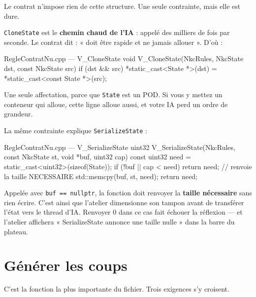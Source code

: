 Le contrat n'impose rien de cette structure. Une seule contrainte, mais elle est
dure.

\begin{nkpiege}
\texttt{CloneState} est le \textbf{chemin chaud de l'IA} : appelé des milliers de
fois par seconde. Le contrat dit : « doit être rapide et ne jamais allouer ».
D'où :

\begin{nkcode}{RegleContratNu.cpp — V\_CloneState}
void V_CloneState(NkcRules, NkcState dst, const NkcState src) {
    if (dst && src) *static_cast<State *>(dst) = *static_cast<const State *>(src);
}
\end{nkcode}

Une seule affectation, parce que \texttt{State} est un POD. Si vous y mettez un
conteneur qui alloue, cette ligne alloue aussi, et votre IA perd un ordre de
grandeur.
\end{nkpiege}

La même contrainte explique \texttt{SerializeState} :

\begin{nkcode}{RegleContratNu.cpp — V\_SerializeState}
uint32 V_SerializeState(NkcRules, const NkcState st, void *buf, uint32 cap) {
    const uint32 need = static_cast<uint32>(sizeof(State));
    if (!buf || cap < need) return need;   // renvoie la taille NECESSAIRE
    std::memcpy(buf, st, need);
    return need;
}
\end{nkcode}

\begin{nkpiege}
Appelée avec \texttt{buf == nullptr}, la fonction doit renvoyer la \textbf{taille
nécessaire} sans rien écrire. C'est ainsi que l'atelier dimensionne son tampon
avant de transférer l'état vers le thread d'IA. Renvoyer 0 dans ce cas fait
échouer la réflexion — et l'atelier affichera « SerializeState annonce une taille
nulle » dans la barre du plateau.
\end{nkpiege}

\section{Générer les coups}

C'est la fonction la plus importante du fichier. Trois exigences s'y croisent.

